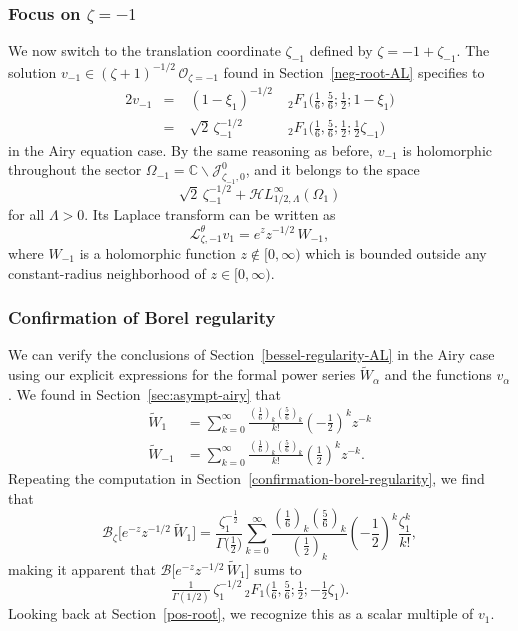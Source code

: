 \documentclass{article}
\newcommand{\singexp}[2]{\mathcal{H}L^\infty_{#1, #2}}
\newcommand{\C}{\mathbb{C}}
\newcommand{\laplace}{\mathcal{L}}
\newcommand{\borel}{\mathcal{B}}
\theoremstyle{definition}
\theoremstyle{plain}
\begin{document}
\subsubsection{Focus on $\zeta = -1$}\label{neg-root}
We now switch to the translation coordinate $\zeta_{-1}$ defined by $\zeta = -1 + \zeta_{-1}$. The solution $v_{-1} \in (\zeta+1)^{-1/2}\,\mathcal{O}_{\zeta=-1}$ found in Section~\ref{neg-root-AL} specifies to
\begin{alignat*}{2}
v_{-1} &=\;& (1-\xi_1)^{-1/2} &\;{}_2F_1\big(\tfrac{1}{6}, \tfrac{5}{6}; \tfrac{1}{2}; 1-\xi_1\big) \\[1mm]
&=\;& \sqrt{2}\,\zeta_{-1}^{-1/2} &\;{}_2F_1\big(\tfrac{1}{6}, \tfrac{5}{6}; \tfrac{1}{2}; \tfrac{1}{2}\zeta_{-1}\big)
\end{alignat*}
in the Airy equation case. By the same reasoning as before, $v_{-1}$ is holomorphic throughout the sector $\Omega_{-1} = \C \smallsetminus \mathcal{J}^0_{\zeta_{-1}, 0}$, and it belongs to the space
\[ \sqrt{2}\,\zeta_{-1}^{-1/2} + \singexp{1/2}{\Lambda}(\Omega_1) \]
for all $\Lambda > 0$. Its Laplace transform can be written as
\[ \laplace^\theta_{\zeta, -1} v_1 = e^z z^{-1/2}\,W_{-1}, \]
where $W_{-1}$ is a holomorphic function $z \notin [0, \infty)$ which is bounded outside any constant-radius neighborhood of $z \in [0, \infty)$.
%
\subsubsection{Confirmation of Borel regularity}\label{confirmation-borel-regularity-airy}
%
We can verify the conclusions of Section~\ref{bessel-regularity-AL} in the Airy case using our explicit expressions for the formal power series $\tilde{W}_\alpha$ and the functions $v_\alpha$. We found in Section~\ref{sec:asympt-airy} that
\begin{align*}
\tilde{W}_1 & = \sum_{k = 0}^{\infty} \frac{\left(\tfrac{1}{6}\right)_k \left(\tfrac{5}{6}\right)_k}{k!} \left(-\frac{1}{2}\right)^k z^{-k} \\
\tilde{W}_{-1} & = \sum_{k = 0}^{\infty} \frac{\left(\tfrac{1}{6}\right)_k \left(\tfrac{5}{6}\right)_k}{k!} \left(\frac{1}{2}\right)^k z^{-k}.
\end{align*}
Repeating the computation in Section~\ref{confirmation-borel-regularity}, we find that
\[ \borel_\zeta \big[ e^{-z} z^{-1/2}\,\tilde{W}_1 \big] = \frac{\zeta_1^{-\frac{1}{2}}}{\Gamma\big(\frac{1}{2}\big)} \sum_{k = 0}^{\infty} \frac{\left(\tfrac{1}{6}\right)_k \left(\tfrac{5}{6}\right)_k}{\left(\frac{1}{2}\right)_k} \left(-\frac{1}{2}\right)^k \frac{\zeta_1^k}{k!}, \]
making it apparent that $\borel\big[ e^{-z} z^{-1/2}\,\tilde{W}_1 \big]$ sums to
\[ \tfrac{1}{\Gamma(1/2)}\,\zeta_1^{-1/2}\,{}_2F_1\big(\tfrac{1}{6}, \tfrac{5}{6}; \tfrac{1}{2}; -\tfrac{1}{2}\zeta_1\big). \]
Looking back at Section~\ref{pos-root}, we recognize this as a scalar multiple of $v_1$.
\end{document}
